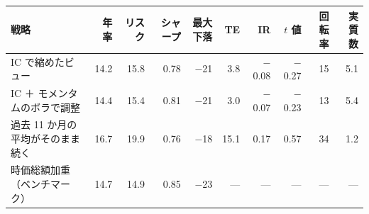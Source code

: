 \begin{tabular}{lrrrrrrrrr}
\toprule
戦略 & 年率 & リスク & シャープ & 最大下落 & TE & IR & $t$ 値 & 回転率 & 実質数 \\
\midrule
IC で縮めたビュー & 14.2 & 15.8 & 0.78 & \ensuremath{-}21 & 3.8 & \ensuremath{-}0.08 & \ensuremath{-}0.27 & 15 & 5.1 \\
IC ＋ モメンタムのボラで調整 & 14.4 & 15.4 & 0.81 & \ensuremath{-}21 & 3.0 & \ensuremath{-}0.07 & \ensuremath{-}0.23 & 13 & 5.4 \\
過去 11 か月の平均がそのまま続く & 16.7 & 19.9 & 0.76 & \ensuremath{-}18 & 15.1 & 0.17 & 0.57 & 34 & 1.2 \\
時価総額加重（ベンチマーク） & 14.7 & 14.9 & 0.85 & \ensuremath{-}23 & --- & --- & --- & --- & --- \\
\bottomrule
\end{tabular}
